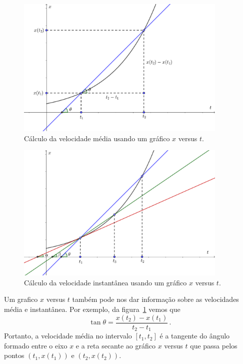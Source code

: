 \documentclass[12pt, a4paper]{article}
\begin{document}
\begin{figure}[ht]
  \centering
  \includegraphics[width=0.9\textwidth,keepaspectratio]{2-movimento-retilineo-fig2.pdf}
  \caption{Cálculo da velocidade média usando um gráfico $x$ versus $t$.}
  \label{fig2}
\end{figure}

\begin{figure}[ht]
  \centering
  \includegraphics[width=0.9\textwidth,keepaspectratio]{2-movimento-retilineo-fig3.pdf}
  \caption{Cálculo da velocidade instantânea usando um gráfico $x$ versus $t$.}
  \label{fig3}
\end{figure}


Um grafico $x$ versus $t$ também pode nos dar informação sobre as velocidades média e instantânea. Por exemplo, da figura~\ref{fig2} vemos que
$$\tan\theta=\frac{x(t_2)-x(t_1)}{t_2-t_1}\,.$$
Portanto, a velocidade média no intervalo $[t_1,t_2]$ é a tangente do ângulo formado entre o eixo $x$ e a reta secante ao gráfico $x$ versus $t$ que passa pelos pontos $(t_1,x(t_1))$ e $(t_2,x(t_2))$.
\end{document}
